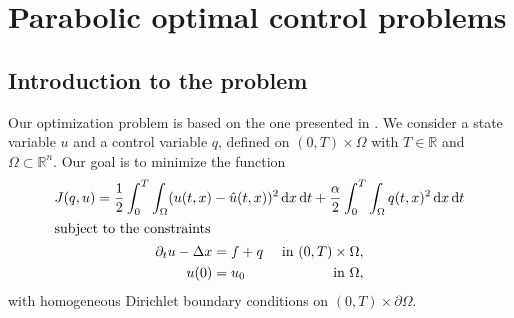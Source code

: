\chapter{Parabolic optimal control problems}

\section{Introduction to the problem}
Our optimization problem is based on the one presented in \cite{doi:10.1137/070694016}. We consider a state variable $u$ and a control variable $q$, defined on $(0,T)\times\Omega$ with $T\in\mathbb{R}$ and $\Omega\subset\mathbb{R}^n$. Our goal is to minimize the function
\begin{subequations}
\label{conProb}
\begin{gather}
J(q,u)=\frac{1}{2}\int_0^T\int_\Omega(u(t,x)-\hat{u}(t,x))^2\,\mathrm{d}x\,\mathrm{d}t+\frac{\alpha}{2}\int_0^T\int_\Omega q(t,x)^2\,\mathrm{d}x\,\mathrm{d}t\label{objFun}\\
\intertext{subject to the constraints}
\begin{aligned}
	\partial_tu-\Delta x&=f+q&\text{ in }(0,T)\times\Omega,\\
	u(0)&=u_0&\text{ in }\Omega,
\end{aligned}
\label{constraints}
\end{gather}
\end{subequations}
with homogeneous Dirichlet boundary conditions on $(0,T)\times\partial\Omega$.

